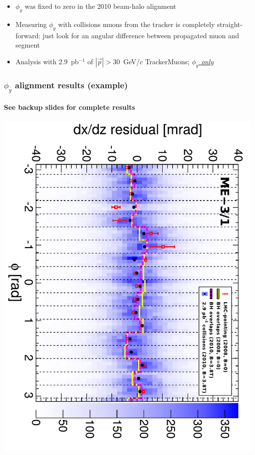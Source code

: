 \documentclass[compress]{beamer}
\begin{document}
\begin{frame}
\begin{itemize}
\item $\phi_y$ was fixed to zero in the 2010 beam-halo alignment

\item Measuring $\phi_y$ with collisions muons from the tracker is
  completely straight-forward: just look for an angular difference
  between propagated muon and segment

\item Analysis with 2.9~pb$^{-1}$ of $|\vec{p}| > 30$~GeV/$c$
  TrackerMuons; \underline{\it $\phi_y$ only}
\end{itemize}

\end{frame}

\begin{frame}
\frametitle{$\phi_y$ alignment results (example)}
\framesubtitle{See backup slides for complete results}
\includegraphics[height=\linewidth, angle=90]{mem3phiy_all.pdf}
\label{mem31phiy}
\end{frame}
\end{document}
